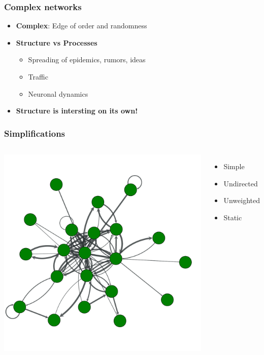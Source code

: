 \documentclass{beamer}
\begin{document}
\begin{frame}
    \frametitle{Complex networks}
    \begin{itemize}
    \setlength\itemsep{2em}
       \item{\Large {\bf Complex}: Edge of order and randomness}
        \pause
        \item{\Large {\bf Structure vs Processes}
            \begin{itemize}
            \setlength\itemsep{1em}
                \item{Spreading of epidemics, rumors, ideas}
                \item{Traffic}
                \item{Neuronal dynamics}
            \end{itemize}
        }
        \pause
        \item{\Large \bf Structure is intersting on its own!}
    \end{itemize}
\end{frame}
\begin{frame}
    \frametitle{Simplifications}
    \begin{columns}
            \centering
            \includegraphics[width=0.9\columnwidth]{weighted_directed_nonsimple2.pdf}
            \centering
            \begin{itemize}
            \setlength\itemsep{1em}
                \item{Simple}
                \item{Undirected}
                \item{Unweighted}
                \item{Static}
            \end{itemize}
    \end{columns}
\end{frame}
\end{document}
